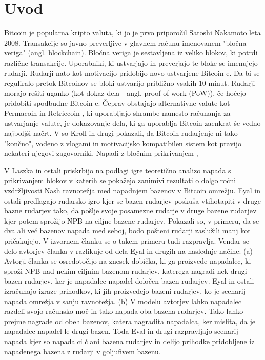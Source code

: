 \documentclass{acm_proc_article-sp}
\begin{document}
\section{Uvod}
Bitcoin je popularna kripto valuta, ki jo je prvo priporočil Satoshi Nakamoto \cite{nakamoto} leta 2008. Transakcije so javno preverljive v glavnem računu imenovanem "bločna veriga" (angl. blockchain). Bločna veriga je sestavljena iz veliko blokov, ki potrdi različne transakcije. Uporabniki, ki ustvarjajo in preverjajo te bloke se imenujejo rudarji. Rudarji nato kot motivacijo pridobijo novo ustvarjene Bitcoin-e. Da bi se reguliralo pretok Bitcoinov se bloki ustvarijo približno vsakih 10 minut. Rudarji morajo rešiti uganko (kot dokaz dela - angl. proof of work (PoW)), če hočejo pridobiti spodbudne Bitcoin-e. Čeprav obstajajo alternativne valute kot Permacoin \cite{permacoin} in Retriecoin \cite{retriecoin}, ki uporabljajo shrambe namesto računanja za ustvarjanje valute, je dokazovanje dela, ki ga uporablja Bitcoin zaenkrat še vedno najboljši načrt. V \cite{economicsofbitcoin} so Kroll  in drugi pokazali, da Bitcoin rudarjenje ni tako "končno", vodeno z vlogami in motivacijsko kompatibilen sistem kot pravijo nekateri njegovi zagovorniki. Napadi z bločnim prikrivanjem \cite{analysisofbitcoin},\cite{financialcryptography}


V \cite{financialcryptography} Laszka in ostali priskrbijo na podlagi igre teoretično analizo napada s prikrivanjem blokov v katerih se pokažejo zanimivi rezultati o dolgolročni vzdržljivosti Nash ravnotežja med napadnjem bazenov v Bitcoin omrežju. Eyal in ostali \cite{minnersdilemma} predlagajo rudarsko igro kjer se bazen rudarjev poskuša vtihotapiti v druge bazne rudarjev tako, da pošlje svoje posamezne rudarje v druge bazene rudarjev kjer potem sprožijo NPB na ciljne bazene rudarjev. Pokazali so, v primeru, da se dva ali več bazenov napada med seboj, bodo pošteni rudarji zaslužili manj kot pričakujejo. V izvornem članku se o takem primeru tudi razpravlja. Vendar se delo avtorjev članka v \cite{originalarticle} razlikuje od dela Eyal in drugih \cite{minnersdilemma} na naslednje načine: (a) Avtorji članka se osredotočijo na znesek dobička, ki ga proizvede napadalec, ki sproži NPB nad nekim ciljnim bazenom rudarjev, katerega nagradi nek drugi bazen rudarjev, ker je napadalec napadel določen bazen rudarjev. Eyal in ostali izračunajo izraze prihodkov, ki jih proizvedejo bazeni rudarjev, ko je scenarij napada omrežja v sanju ravnotežja. (b) V modelu avtorjev \cite{originalarticle} lahko napadalec razdeli svojo računsko moč in tako napada oba bazena rudarjev. Tako lahko prejme nagrade od obeh bazenov, katera nagradita napadalca, ker mislita, da je napadalec napadel le drugi bazen. Toda Eval in drugi razpravljajo scenarij napada kjer so napadalci člani bazena rudarjev in delijo prihodke pridobljene iz napadenega bazena z rudarji v goljufivem bazenu.
\end{document}
